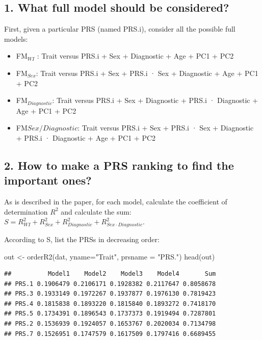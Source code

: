 \documentclass[
]{article}
\newenvironment{Shaded}{\begin{snugshade}}{\end{snugshade}}
\newcommand{\AttributeTok}[1]{\textcolor[rgb]{0.77,0.63,0.00}{#1}}
\newcommand{\FunctionTok}[1]{\textcolor[rgb]{0.00,0.00,0.00}{#1}}
\newcommand{\NormalTok}[1]{#1}
\newcommand{\OtherTok}[1]{\textcolor[rgb]{0.56,0.35,0.01}{#1}}
\newcommand{\StringTok}[1]{\textcolor[rgb]{0.31,0.60,0.02}{#1}}
\providecommand{\tightlist}{%
  \setlength{\itemsep}{0pt}\setlength{\parskip}{0pt}}
\begin{document}
\hypertarget{what-full-model-should-be-considered}{%
\subsection{1. What full model should be
considered?}\label{what-full-model-should-be-considered}}

First, given a particular PRS (named PRS.i), consider all the possible
full models:

\begin{itemize}
\tightlist
\item
  FM\(_{WI}\) : Trait versus PRS.i + Sex + Diagnostic + Age + PC1 + PC2
\item
  FM\(_{Sex}\): Trait versus PRS.i + Sex + PRS.i · Sex + Diagnostic +
  Age + PC1 + PC2
\item
  FM\(_{Diagnostic}\): Trait versus PRS.i + Sex + Diagnostic + PRS.i ·
  Diagnostic + Age + PC1 + PC2
\item
  FM\({Sex/Diagnostic}\): Trait versus PRS.i + Sex + PRS.i · Sex +
  Diagnostic + PRS.i · Diagnostic + Age + PC1 + PC2
\end{itemize}

\hypertarget{how-to-make-a-prs-ranking-to-find-the-important-ones}{%
\subsection{2. How to make a PRS ranking to find the important
ones?}\label{how-to-make-a-prs-ranking-to-find-the-important-ones}}

As is described in the paper, for each model, calculate the coefficient
of determination \(R^2\) and calculate the sum:
\(S = R^2_{WI} + R^2_{Sex} + R^2_{Diagnostic} + R^2_{Sex \cdot Diagnostic}\).

According to S, list the PRSs in decreasing order:

\begin{Shaded}
\begin{Highlighting}[]
\NormalTok{out }\OtherTok{\textless{}{-}} \FunctionTok{orderR2}\NormalTok{(dat, }\AttributeTok{yname=}\StringTok{"Trait"}\NormalTok{, }\AttributeTok{prsname =} \StringTok{"PRS."}\NormalTok{)}
\FunctionTok{head}\NormalTok{(out)}
\end{Highlighting}
\end{Shaded}

\begin{verbatim}
##          Model1    Model2    Model3    Model4       Sum
## PRS.1 0.1906479 0.2106171 0.1928382 0.2117647 0.8058678
## PRS.3 0.1933149 0.1972267 0.1937877 0.1976130 0.7819423
## PRS.4 0.1815838 0.1893220 0.1815840 0.1893272 0.7418170
## PRS.5 0.1734391 0.1896543 0.1737373 0.1919494 0.7287801
## PRS.2 0.1536939 0.1924057 0.1653767 0.2020034 0.7134798
## PRS.7 0.1526951 0.1747579 0.1617509 0.1797416 0.6689455
\end{verbatim}
\end{document}
